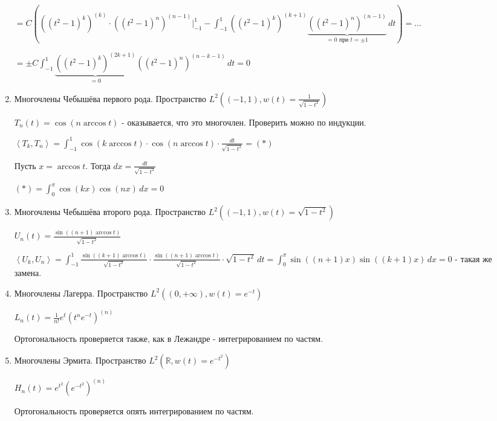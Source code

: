 \begin{remark}
\begin{remark}
\begin{example}
\begin{enumerate}
{                    $= C \left( ((t^2 - 1)^k)^{(k)} \cdot ((t^2 - 1)^n)^{(n - 1)} \bigg |_{-1}^1 - \int_{-1}^1 ((t^2 - 1)^k)^{(k + 1)} \underbrace{((t^2 - 1)^n)^{(n - 1)}}_{=0 \text{ при } t = \pm 1} \, dt \right) = \ldots$
                    
                    $= \pm C \int_{-1}^1 \underbrace{((t^2 - 1)^k)^{(2k + 1)}}_{=0} ((t^2 - 1)^n)^{(n - k - 1)} \, dt = 0$
                }
                \item {
                    Многочлены Чебышёва первого рода. Пространство $L^2 ((-1, 1), w(t) = \frac{1}{\sqrt{1 - t^2}})$

                    $T_n (t) = \cos (n \arccos t)$ - оказывается, что это многочлен. Проверить можно по индукции.

                    $\left < T_k, T_n \right > = \int_{-1}^1 \cos (k \arccos t) \cdot \cos (n \arccos t) \cdot \frac{dt}{\sqrt{1 - t^2}} = (*)$

                    Пусть $x = \arccos t$. Тогда $dx = \frac{dt}{\sqrt{1 - t^2}}$

                    $(*) = \int_0^\pi \cos (kx) \cos (nx) \, dx = 0$
                }
                \item {
                    Многочлены Чебышёва второго рода. Пространство $L^2 ((-1, 1), w(t) = \sqrt{1 - t^2})$

                    $U_n (t) = \frac{\sin ((n + 1) \arccos t)}{\sqrt{1 - t^2}}$

                    $\left < U_k, U_n \right > = \int_{-1}^1 \frac{\sin ((k + 1) \arccos t)}{\sqrt{1 - t^2}} \cdot \frac{\sin ((n + 1) \arccos t)}{\sqrt{1 - t^2}} \cdot \sqrt{1 - t^2} \, dt = \int_0^\pi \sin ((n + 1)x) \sin ((k + 1)x) \, dx = 0$ - такая же замена.
                }
                \item {
                    Многочлены Лагерра. Пространство $L^2 ((0, +\infty), w(t) = e^{-t})$

                    $L_n (t) = \frac{1}{n!} e^t (t^n e^{-t})^{(n)}$

                    Ортогональность проверяется также, как в Лежандре - интегрированием по частям.
                }
                \item {
                    Многочлены Эрмита. Пространство $L^2 (\mathbb{R}, w(t) = e^{-t^2})$

                    $H_n (t) = e^{t^2} (e^{-t^2})^{(n)}$

                    Ортогональность проверяется опять интегрированием по частям.
                }
            \end{enumerate}
        \end{example}
    \end{remark}
\end{remark}

